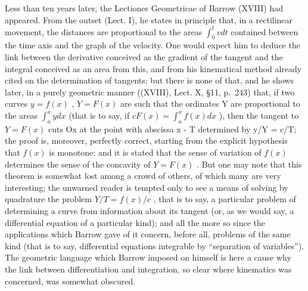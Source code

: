 Less than ten years later, the Lectiones Geometricae of Barrow (XVIII) had appeared. From the outset (Lect. I), he states in principle that, in a rectilinear movement, the distances are proportional to the areas \(\int_{0}^{t} v dt\) contained between the time axis and the graph of the velocity. One would expect him to deduce the link between the derivative conceived as the gradient of the tangent and the integral conceived as an area from this, and from his kinematical method already cited on the determination of tangents; but there is none of that, and he shows later, in a purely geometric manner ((XVIII), Lect. X, §11, p.~243) that, if two curves \(y = f(x)\) , \(Y = F(x)\) are such that the ordinates Y are proportional to the areas \(\int_{a}^{x} y dx\) (that is to say, if \(cF(x) = \int_{a}^{x} f(x) dx\) ), then the tangent to \(Y = F(x)\) cuts Ox at the point with abscissa x - T determined by y/Y = c/T; the proof is, moreover, perfectly correct, starting from the explicit hypothesis that \(f(x)\) is monotone: and it is stated that the sense of variation of \(f(x)\) determines the sense of the concavity of \(Y = F(x)\) . But one may note that this theorem is somewhat lost among a crowd of others, of which many are very interesting; the unwarned reader is tempted only to see a means of solving by quadrature the problem \(Y/T = f(x)/c\) , that is to say, a particular problem of determining a curve from information about its tangent (or, as we would say, a differential equation of a particular kind); and all the more so since the applications which Barrow gave of it concern, before all, problems of the same kind (that is to say, differential equations integrable by ``separation of variables''). The geometric language which Barrow imposed on himself is here a cause why the link between differentiation and integration, so clear where kinematics was concerned, was somewhat obscured.

